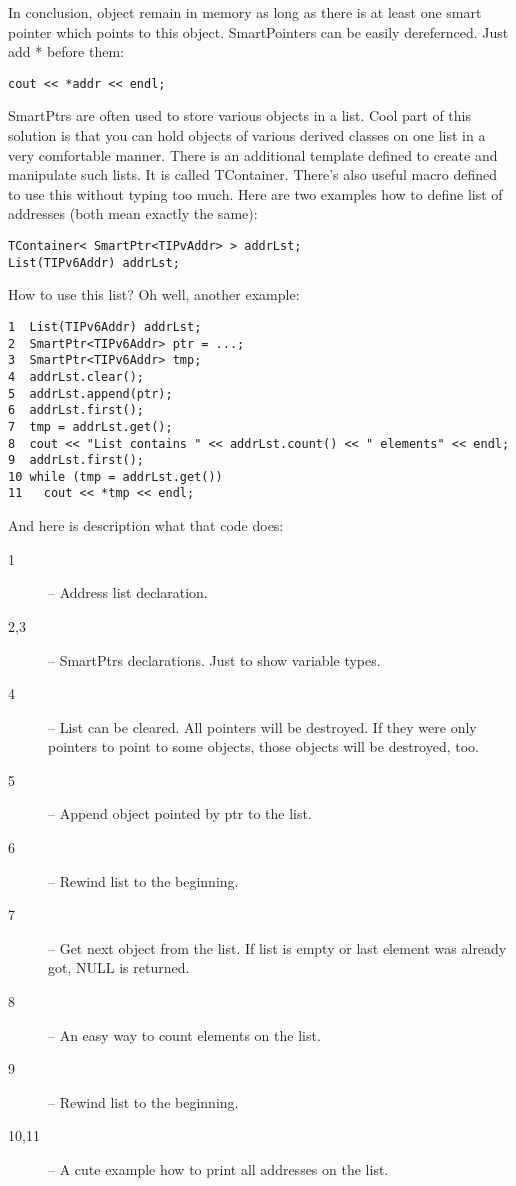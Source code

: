 In conclusion, object remain in memory as long as there is at least
one smart pointer which points to this object. SmartPointers can be
easily derefernced. Just add * before them:
\begin{verbatim}
cout << *addr << endl;
\end{verbatim}

SmartPtrs are often used to store various objects in a list. Cool part
of this solution is that you can hold objects of various derived
classes on one list in a very comfortable manner. There is an
additional template defined to create and manipulate such lists. It is
called TContainer. There's also useful macro defined to use this
without typing too much. Here are two examples how to define list of
addresses (both mean exactly the same):
\begin{verbatim}
TContainer< SmartPtr<TIPvAddr> > addrLst;
List(TIPv6Addr) addrLst;
\end{verbatim}

How to use this list? Oh well, another example:
\begin{verbatim}
1  List(TIPv6Addr) addrLst;
2  SmartPtr<TIPv6Addr> ptr = ...;
3  SmartPtr<TIPv6Addr> tmp;
4  addrLst.clear();
5  addrLst.append(ptr);
6  addrLst.first();
7  tmp = addrLst.get();
8  cout << "List contains " << addrLst.count() << " elements" << endl;
9  addrLst.first();
10 while (tmp = addrLst.get()) 
11   cout << *tmp << endl;
\end{verbatim}

And here is description what that code does:

\begin{description}
\item[1] -- Address list declaration.
\item[2,3] -- SmartPtrs declarations. Just to show variable types.
\item[4] -- List can be cleared. All pointers will be destroyed. If
  they were only pointers to point to some objects, those objects will
  be destroyed, too.
\item[5] -- Append object pointed by ptr to the list.
\item[6] -- Rewind list to the beginning.
\item[7] -- Get next object from the list. If list is empty or last
  element was already got, NULL is returned.
\item[8] -- An easy way to count elements on the list.
\item[9] -- Rewind list to the beginning.
\item[10,11] -- A cute example how to print all addresses on the list.
\end{description}


